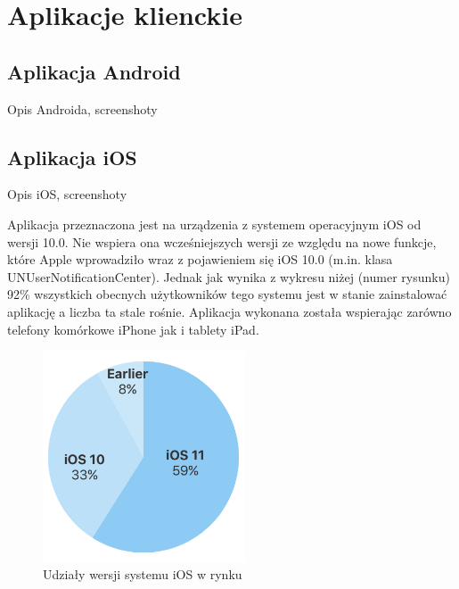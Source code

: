 \chapter{Aplikacje klienckie}

\section*{Aplikacja Android}

Opis Androida, screenshoty


\section*{Aplikacja iOS}

Opis iOS, screenshoty

Aplikacja przeznaczona jest na urządzenia z systemem operacyjnym iOS od wersji 10.0. 
Nie wspiera ona wcześniejszych wersji ze względu na nowe funkcje, które Apple wprowadziło wraz z pojawieniem się iOS 10.0 (m.in. klasa UNUserNotificationCenter). Jednak jak wynika z wykresu niżej (numer rysunku) 92\% wszystkich obecnych użytkowników tego systemu jest w stanie zainstalować aplikację a liczba ta stale rośnie. Aplikacja wykonana została wspierając zarówno telefony komórkowe iPhone jak i tablety iPad. 
\begin{figure}[h]
	\centering
	\includegraphics[width=6cm]{iOSstat}
	\caption{Udziały wersji systemu iOS w rynku}
\end{figure}

